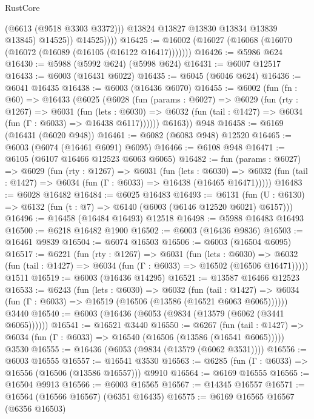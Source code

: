 \begin{lexlean}{RustCore}
\begin{coremodule}
                    (@6613 (@9518 @3303 @3372)))
                  @13824
                  @13827
                  @13830
                  @13834
                  @13839
                  @13845)
                @14525))
            @14525))))
@16425 := @16002 (@16027 (@16068 (@16070 (@16072 (@16089 (@16105 (@16122 @16417)))))))
@16426 := @5986 @624
@16430 := @5988 (@5992 @624) (@5998 @624)
@16431 := @6007 @12517
@16433 := @6003 (@16431 @6022)
@16435 := @6045 (@6046 @624)
@16436 := @6041 @16435
@16438 := @6003 (@16436 @6070)
@16455 := @6002
    (fun (fn : @60) =>
    @16433
      (@6025
        (@6028
          (fun (params : @6027) =>
          @6029
            (fun (rty : @1267) =>
            @6031
              (fun (lets : @6030) =>
              @6032 (fun (tail : @1427) => @6034 (fun (Γ : @6033) => @16438 @6117))))))
        @6163))
    @948
@16458 := @6169 (@16431 (@6020 @948))
@16461 := @6082 (@6083 @948) @12520
@16465 := @6003 (@6074 (@16461 @6091) @6095)
@16466 := @6108 @948
@16471 := @6105 (@6107 @16466 @12523 @6063 @6065)
@16482 := fun (params : @6027) =>
  @6029
    (fun (rty : @1267) =>
    @6031
      (fun (lets : @6030) =>
      @6032 (fun (tail : @1427) => @6034 (fun (Γ : @6033) => @16438 (@16465 @16471)))))
@16483 := @6028 @16482
@16484 := @6025 @16483
@16493 := @6131
    (fun (U : @6130) => @6132 (fun (t : @7) => @6140 (@6003 (@6146 @12520 @6021) @6157)))
@16496 := @16458 (@16484 @16493) @12518
@16498 := @5988 @16483 @16493
@16500 := @6218 @16482 @1900
@16502 := @6003 (@16436 @9836)
@16503 := @16461 @9839
@16504 := @6074 @16503
@16506 := @6003 (@16504 @6095)
@16517 := @6221
    (fun (rty : @1267) =>
    @6031
      (fun (lets : @6030) =>
      @6032 (fun (tail : @1427) => @6034 (fun (Γ : @6033) => @16502 (@16506 @16471)))))
    @1511
@16519 := @6003 (@16436 @14295)
@16521 := @13587 @16466 @12523
@16533 := @6243
    (fun (lets : @6030) =>
    @6032
      (fun (tail : @1427) =>
      @6034 (fun (Γ : @6033) => @16519 (@16506 (@13586 (@16521 @6063 @6065))))))
    @3440
@16540 := @6003 (@16436 (@6053 (@9834 (@13579 (@6062 (@3441 @6065))))))
@16541 := @16521 @3440
@16550 := @6267
    (fun (tail : @1427) => @6034 (fun (Γ : @6033) => @16540 (@16506 (@13586 (@16541 @6065)))))
    @3530
@16555 := @16436 (@6053 (@9834 (@13579 (@6062 @3531))))
@16556 := @6003 @16555
@16557 := @16541 @3530
@16563 := @6285 (fun (Γ : @6033) => @16556 (@16506 (@13586 @16557))) @9910
@16564 := @6169 @16555
@16565 := @16504 @9913
@16566 := @6003 @16565
@16567 := @14345 @16557
@16571 := @16564 (@16566 @16567) (@6351 @16435)
@16575 := @6169 @16565 @16567 (@6356 @16503)

\end{coremodule}
\end{lexlean}
